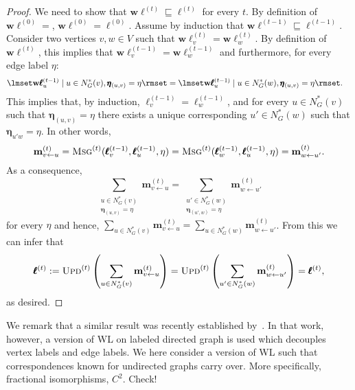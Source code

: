 \begin{proof}
We need to show that $\mathbf{w}\pmb{\ell}^{(t)}\sqsubseteq \pmb{\ell}^{(t)}$ for every $t$.
By definition of $\mathbf{w}\pmb{\ell}^{(0)}=$, $\mathbf{w}\pmb{\ell}^{(0)}=\pmb{\ell}^{(0)}$.
Assume by induction that $\mathbf{w}\pmb{\ell}^{(t-1)}\sqsubseteq \pmb{\ell}^{(t-1)}$. Consider
two vertices $v,w\in V$ such that $\mathbf{w}\pmb{\ell}^{(t)}_v=\mathbf{w}\pmb{\ell}^{(t)}_w$.
By definition of $\mathbf{w}\pmb{\ell}^{(t)}$, this implies that 
$\mathbf{w}\pmb{\ell}^{(t-1)}_v=\mathbf{w}\pmb{\ell}^{(t-1)}_w$ and furthermore, for every
edge label $\eta$:
\begin{align*}
	\lmset \mathbf{w}\pmb{\ell}^{(t-1)}_u\mid u\in N_G^*(v), \pmb{\eta}_{(u,v)}=\eta\rmset&=	\lmset \mathbf{w}\pmb{\ell}^{(t-1)}_u\mid u\in N_G^*(w), \pmb{\eta}_{(u,v)}=\eta\rmset.
\end{align*}
This implies that, by induction, $\pmb{\ell}^{(t-1)}_v=\pmb{\ell}^{(t-1)}_w$, and for every $u\in N_G^*(v)$ such that
$\pmb{\eta}_{(u,v)}=\eta$  there exists a unique corresponding $u'\in N_G^*(w)$ such that $\pmb{\eta}_{u'w}=\eta$. In other words,
$$
\mathbf{m}^{(t)}_{v\gets u}=\textsc{Msg}^{(t)}(\pmb{\ell}^{(t-1)}_v,\pmb{\ell}^{(t-1)}_u,\eta)=
\textsc{Msg}^{(t)}(\pmb{\ell}^{(t-1)}_w,\pmb{\ell}^{(t-1)}_u,\eta)=\mathbf{m}^{(t)}_{w\gets u'}.$$
As a consequence,
$$
\sum_{\substack{u\in N_G^*(v)\\\pmb{\eta}_{(u,v)}=\eta}} \mathbf{m}^{(t)}_{v\gets u}=\sum_{\substack{u'\in N_G^*(w)\\\pmb{\eta}_{(u',w)}=\eta}} \mathbf{m}^{(t)}_{w\gets u'}
$$
for every $\eta$ and hence, $\sum_{u\in N_G^*(v)}\mathbf{m}^{(t)}_{v\gets u}=
\sum_{u\in N_G^*(w)}\mathbf{m}^{(t)}_{w\gets u'}
$. From this we can infer that
$$
\pmb{\ell}^{(t)}:=\textsc{Upd}^{(t)}\left(\sum_{u\in N_G^*(v)}\mathbf{m}^{(t)}_{v\gets u}\right)=\textsc{Upd}^{(t)}\left(\sum_{u'\in N_G^*(w)}\mathbf{m}^{(t)}_{w\gets u'}\right)=\pmb{\ell}^{(t)},
$$
as desired.
%
\end{proof}

We remark that a similar result was recently established by~\citet{Jaume2019}. In that work, however, a version of WL on labeled directed graph is used which decouples vertex labels and edge labels. We here consider a version of WL such that correspondences known for undirected graphs carry over. More specifically,
fractional isomorphisms, $C^2$. Check!
%
%

